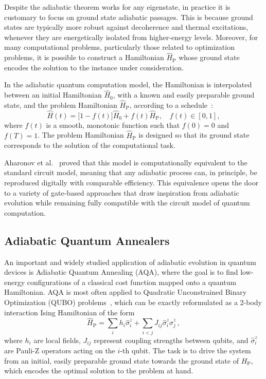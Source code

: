 Despite the adiabatic theorem works for any eigenstate, in practice it is customary to focus on ground state adiabatic passages. This is because ground states are typically more robust against decoherence and thermal excitations, whenever they are energetically isolated from higher-energy levels. Moreover, for many computational problems, particularly those related to optimization problems, it is possible to construct a Hamiltonian $\hat{H}_\mathrm{P}$ whose ground state encodes the solution to the instance under consideration.

In the adiabatic quantum computation model, the Hamiltonian is interpolated between an initial Hamiltonian $\hat{H}_0$, with a known and easily preparable ground state, and the problem Hamiltonian $\hat{H}_\mathrm{P}$, according to a schedule~\cite{albash_adiabatic_2018}:
\begin{equation}
    \hat{H}(t) = \big[1 - f(t)\big] \hat{H}_0 + f(t) \hat{H}_\mathrm{P}, \quad f(t) \in [0,1],
    \label{eq:adiabatic_passage}
\end{equation}
where $f(t)$ is a smooth, monotonic function such that $f(0)=0$ and $f(T)=1$. The problem Hamiltonian $\hat{H}_\mathrm{P}$ is designed so that its ground state corresponds to the solution of the computational task.

Aharonov et al.~\cite{aharonov_adiabatic_2004} proved that this model is computationally equivalent to the standard circuit model, meaning that any adiabatic process can, in principle, be reproduced digitally with comparable efficiency. This equivalence opens the door to a variety of gate-based approaches that draw inspiration from adiabatic evolution while remaining fully compatible with the circuit model of quantum computation.

\subsection{Adiabatic Quantum Annealers}
An important and widely studied application of adiabatic evolution in quantum devices is Adiabatic Quantum Annealing (AQA), where the goal is to find low-energy configurations of a classical cost function mapped onto a quantum Hamiltonian. AQA is most often applied to Quadratic Unconstrained Binary Optimization (QUBO) problems~\cite{kadowaki_quantum_1998}, which can be exactly reformulated as a 2-body interaction Ising Hamiltonian of the form
\begin{equation}
    \hat{H}_\mathrm{P} = \sum_i h_i \hat{\sigma}_i^z + \sum_{i<j} J_{ij} \hat{\sigma}_i^z \hat{\sigma}_j^z\,,
    \label{eq:ising_hamiltonian}
\end{equation}
where $h_i$ are local fields, $J_{ij}$ represent coupling strengths between qubits, and $\hat{\sigma}_i^z$ are Pauli-Z operators acting on the $i$-th qubit. The task is to drive the system from an initial, easily preparable ground state towards the ground state of $H_\mathrm{P}$, which encodes the optimal solution to the problem at hand.

